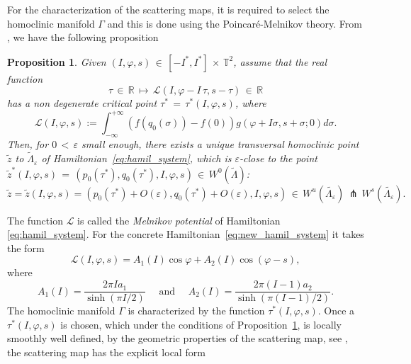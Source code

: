 \documentclass[a4paper,10pt]{article}
\newtheorem{proposition}[theorem]{Proposition}
\theoremstyle{definition}
\begin{document}
For the characterization of the scattering maps, it is required to select the homoclinic manifold $\Gamma$ and this is done using the Poincar\'{e}-Melnikov theory. From \cite{Seara2006,Delshams2011}, we have the following proposition

\begin{proposition}\label{prop:melnpot}
Given $(I,\varphi,s)\,\in\,\left[-I^{*},I^{*}\right]\,\times\,\mathbb{T}^{2}$, assume that the real function
\begin{equation}\label{eq: SM_critical_point}
\tau\,\in\,\mathbb{R}\,\longmapsto\,\mathcal{L}(I,\varphi-I\,\tau,s-\tau)\,\in\,\mathbb{R}
\end{equation}
has a non degenerate critical point $\tau^{*}\, =\, \tau^*(I,\varphi,s)$, where
\begin{equation*}
\mathcal{L}(I,\varphi,s):=\int_{-\infty}^{+\infty}\left(f(q_{0}(\sigma)) - f(0)\right)g(\varphi+I\sigma,s+\sigma;0)d\sigma.
\end{equation*}
Then, for $0\,<\,\varepsilon$ small enough, there exists a unique transversal homoclinic point $\tilde{z}$ to $\tilde{\Lambda}_{\varepsilon}$ of Hamiltonian~\eqref{eq:hamil_system}, which is $\varepsilon$-close to the point
$\tilde{z}^{*}(I,\varphi,s)\,=\,(p_{0}(\tau^{*}),q_{0}(\tau^{*}),I,\varphi,s)\,\in\,W^{0}(\tilde{\Lambda})$:
\begin{equation*}
\tilde{z}=\tilde{z}(I,\varphi,s)=(p_{0}(\tau^{*})+O(\varepsilon), q_{0}(\tau^{*})+O(\varepsilon),I,\varphi,s)\,\in\,W^{u}(\tilde{\Lambda_ {\varepsilon}})\,\pitchfork\,W^{s}(\tilde{\Lambda_{\varepsilon}}).
\end{equation*}
\end{proposition}

The function $\mathcal{L}$ is called the \emph{Melnikov potential} of Hamiltonian \eqref{eq:hamil_system}.
For the concrete Hamiltonian~\eqref{eq:new_hamil_system} it takes the form
\begin{equation}
\mathcal{L}(I,\varphi,s) = A_{1}(I)\cos\varphi + A_{2}(I)\cos(\varphi - s),\label{eq:our_meln_potential}
\end{equation}
where
\begin{equation*}
A_{1}(I) = \frac{2\pi I a_{1}}{\sinh(\pi I/2)} \quad \text{ and }\quad A_{2}(I) = \frac{2\pi(I-1)a_{2}}{\sinh(\pi(I-1)/2)}.
\end{equation*}
The homoclinic manifold $\Gamma$ is characterized by the function $\tau^*(I,\varphi,s)$.
Once a $\tau^*(I,\varphi,s)$ is chosen, which under the conditions of Proposition~\ref{prop:melnpot}, is locally smoothly well defined, by the geometric properties of the scattering map, see \cite{Delshams2008,Delshams2009,Delshams2011}, the scattering map has the explicit local form
\end{document}
